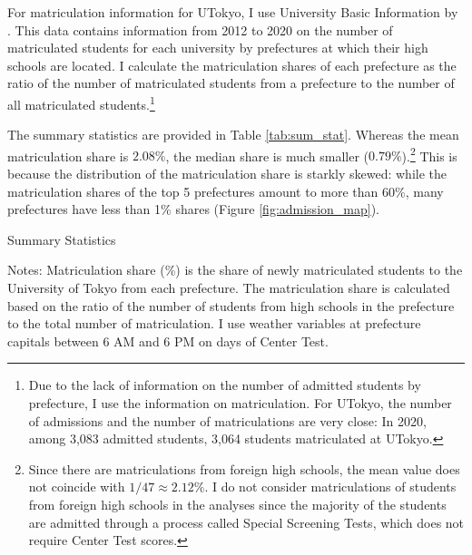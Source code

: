 \documentclass[12pt,letterpaper]{article}
\begin{document}
For matriculation information for UTokyo, I use University Basic Information by .
This data contains information from 2012 to 2020 on the number of matriculated students for each university by prefectures at which their high schools are located.
I calculate the matriculation shares of each prefecture as the ratio of the number of matriculated students from a prefecture to the number of all matriculated students.\footnote{
  Due to the lack of information on the number of admitted students by prefecture, I use the information on matriculation.
  For UTokyo, the number of admissions and the number of matriculations are very close:
  In 2020, among 3,083 admitted students, 3,064 students matriculated at UTokyo.
}

The summary statistics are provided in Table \ref{tab:sum_stat}.
Whereas the mean matriculation share is $2.08 \%$, the median share is much smaller ($0.79 \%$).\footnote{
  Since there are matriculations from foreign high schools, the mean value does not coincide with $1 / 47 \approx 2.12\%$.
  I do not consider matriculations of students from foreign high schools in the analyses since the majority of the students are admitted through a process called Special Screening Tests, which does not require Center Test scores.
}
This is because the distribution of the matriculation share is starkly skewed:
while the matriculation shares of the top 5 prefectures amount to more than 60\%, many prefectures have less than 1\% shares (Figure \ref{fig:admission_map}).


\begin{table}[H]
  \centering
  \caption{Summary Statistics}
  \resizebox{0.8\linewidth}{!}{
  
  }
  \label{tab:sum_stat}
  \footnotesize
  \begin{tablenotes}
    \item 
      Notes:
      Matriculation share (\%) is the share of newly matriculated students to the University of Tokyo from each prefecture.
      The matriculation share is calculated based on the ratio of the number of students from high schools in the prefecture to the total number of matriculation.
      I use weather variables at prefecture capitals between 6 AM and 6 PM on days of Center Test.
  \end{tablenotes}
\end{table}
\end{document}
